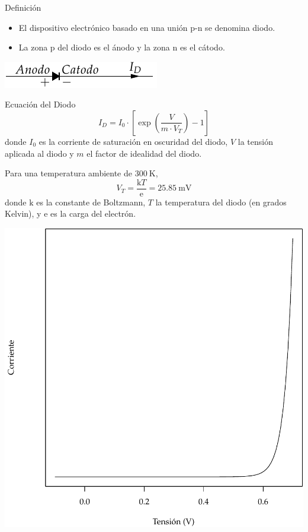 \documentclass[xcolor={usenames,svgnames,dvipsnames}]{beamer}
\begin{document}
\begin{frame}[label=sec-1-5-1]{Definición}
\begin{itemize}
\item El dispositivo electrónico basado en una unión p-n se denomina diodo.

\item La zona p del diodo es el ánodo y la zona n es el cátodo.
\end{itemize}

\includegraphics[width=.9\linewidth]{../figs/Diodo.pdf}
\end{frame}

\begin{frame}[label=sec-1-5-2]{Ecuación del Diodo}
$$I_{D}=I_{0}\cdot[\exp(\frac{V}{m\cdot V_{T}})-1]$$ donde $I_{0}$ es la
corriente de saturación en oscuridad del diodo, $V$ la tensión aplicada
al diodo y $m$ el factor de idealidad del diodo.

Para una temperatura ambiente de $\SI{300}{\kelvin}$,
$$V_{T}=\frac{\mathrm{k}T}{\mathrm{e}}=\SI{25.85}{\milli\volt}$$ donde
$\mathrm{k}$ es la constante de Boltzmann, $T$ la temperatura del diodo
(en grados Kelvin), y $\mathrm{e}$ es la carga del electrón.
\end{frame}

\begin{frame}[label=sec-1-5-3]{}
\includegraphics[width=.9\linewidth]{../figs/EcuacionDiodo.pdf}
\end{frame}
\end{document}

